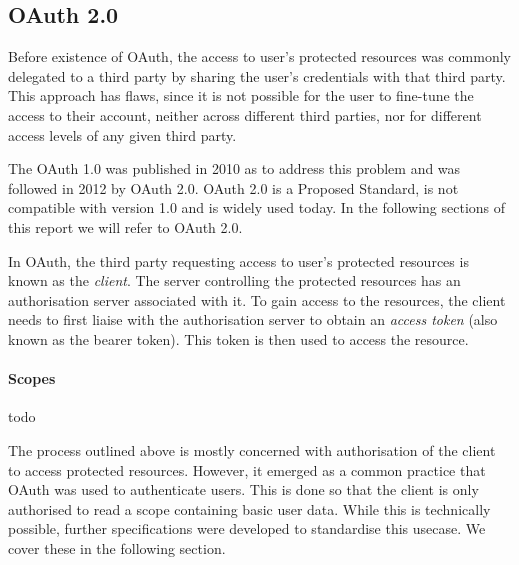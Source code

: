 \subsection{OAuth 2.0}

Before existence of OAuth, the access to user's protected resources was commonly delegated to a third party by sharing the user's credentials with that third party. This approach has flaws, since it is not possible for the user to fine-tune the access to their account, neither across different third parties, nor for different access levels of any given third party. 

The OAuth 1.0 was published in 2010 as to address this problem 
and was followed in 2012 by OAuth 2.0. 
OAuth 2.0 is a Proposed Standard, is not compatible with version 1.0 and is widely used today. In the following sections of this report we will refer to OAuth 2.0.

In OAuth, the third party requesting access to user's protected resources is known as the \textit{client}. The server controlling the protected resources has an authorisation server associated with it. To gain access to the resources, the client needs to first liaise with the authorisation server to obtain an \textit{access token} (also known as the bearer token). This token is then used to access the resource.



\paragraph{Scopes}
todo

The process outlined above is mostly concerned with authorisation of the client to access protected resources. However, it emerged as a common practice
that OAuth was used to authenticate users. This is done so that the client is only authorised to read a scope containing basic user data. While this is technically possible, further specifications were developed to standardise this usecase. We cover these in the following section.
